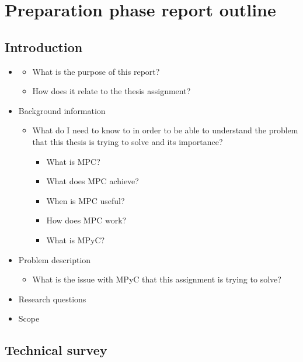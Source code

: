 \hypertarget{preparation-phase-report-outline}{%
\chapter{Preparation phase report
outline}\label{preparation-phase-report-outline}}

\hypertarget{introduction}{%
\section{Introduction}\label{introduction}}

\begin{itemize}
\item
  \begin{itemize}
  \tightlist
  \item
    What is the purpose of this report?
  \item
    How does it relate to the thesis assignment?
  \end{itemize}
\item
  Background information

  \begin{itemize}
  \tightlist
  \item
    What do I need to know to in order to be able to understand the
    problem that this thesis is trying to solve and its importance?

    \begin{itemize}
    \tightlist
    \item
      What is MPC?
    \item
      What does MPC achieve?
    \item
      When is MPC useful?
    \item
      How does MPC work?
    \item
      What is MPyC?
    \end{itemize}
  \end{itemize}
\item
  Problem description

  \begin{itemize}
  \tightlist
  \item
    What is the issue with MPyC that this assignment is trying to solve?
  \end{itemize}
\item
  Research questions
\item
  Scope
\end{itemize}

\hypertarget{technical-survey}{%
\section{Technical survey}\label{technical-survey}}


